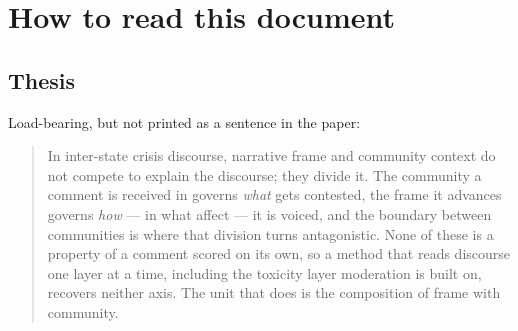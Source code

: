 \section*{How to read this document}

\subsection*{Thesis}

Load-bearing, but not printed as a sentence in the paper:




\begin{quote}
  In inter-state crisis discourse, narrative frame and community context do not
  compete to explain the discourse; they divide it. The community a comment is
  received in governs \emph{what} gets contested, the frame it advances governs
  \emph{how} --- in what affect --- it is voiced, and the boundary between
  communities is where that division turns antagonistic. None of these is a
  property of a comment scored on its own, so a method that reads discourse one
  layer at a time, including the toxicity layer moderation is built on, recovers
  neither axis. The unit that does is the composition of frame with community.
\end{quote}

